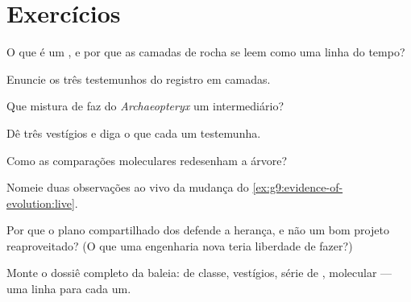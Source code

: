 \section{Exercícios}

\begin{exercise}[$\star$]\label{exo:g9:evidence-of-evolution:1}
O que é um , e por que as camadas de rocha se leem como
uma linha do tempo?
\end{exercise}

\begin{exercise}[$\star$]\label{exo:g9:evidence-of-evolution:2}
Enuncie os três testemunhos do registro em camadas.
\end{exercise}

\begin{exercise}[$\star$]\label{exo:g9:evidence-of-evolution:3}
Que mistura de  faz do \emph{Archaeopteryx} um
intermediário?
\end{exercise}

\begin{exercise}[$\star$]\label{exo:g9:evidence-of-evolution:4}
Dê três vestígios e diga o que cada um testemunha.
\end{exercise}

\begin{exercise}[$\star$]\label{exo:g9:evidence-of-evolution:5}
Como as comparações moleculares redesenham a árvore?
\end{exercise}

\begin{exercise}[$\star$]\label{exo:g9:evidence-of-evolution:6}
Nomeie duas observações ao vivo da mudança do
\cref{ex:g9:evidence-of-evolution:live}.
\end{exercise}

\begin{exercise}[$\star\star$]\label{exo:g9:evidence-of-evolution:7}
Por que o plano compartilhado dos  defende a herança,
e não um bom projeto reaproveitado? (O que uma engenharia
nova teria liberdade de fazer?)
\end{exercise}

\begin{exercise}[$\star\star$]\label{exo:g9:evidence-of-evolution:8}
Monte o dossiê completo da baleia:  de classe,
vestígios, série de ,  molecular --- uma
linha para cada um.
\end{exercise}

